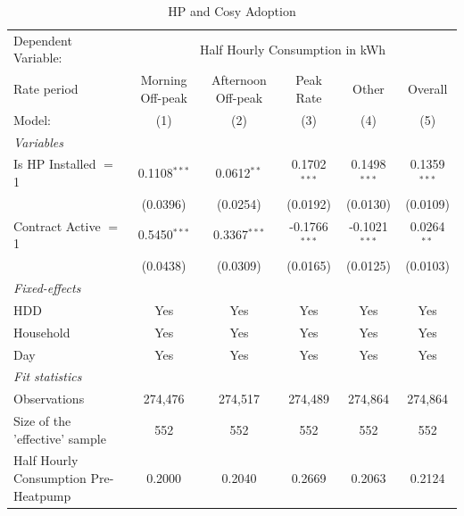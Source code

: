
\begin{table}[htbp]
   \caption{\label{tab:did-hp-install} HP and Cosy Adoption}
   \centering
   \begin{tabular}{lccccc}
      \tabularnewline \midrule \midrule
      Dependent Variable: & \multicolumn{5}{c}{Half Hourly Consumption in kWh}\\
      Rate period                                 & Morning Off-peak & Afternoon Off-peak & Peak Rate       & Other           & Overall \\   
      Model:                                      & (1)              & (2)                & (3)             & (4)             & (5)\\  
      \midrule
      \emph{Variables}\\
      Is HP Installed $=$ 1                       & 0.1108$^{***}$   & 0.0612$^{**}$      & 0.1702$^{***}$  & 0.1498$^{***}$  & 0.1359$^{***}$\\   
                                                  & (0.0396)         & (0.0254)           & (0.0192)        & (0.0130)        & (0.0109)\\   
      Contract Active $=$ 1                       & 0.5450$^{***}$   & 0.3367$^{***}$     & -0.1766$^{***}$ & -0.1021$^{***}$ & 0.0264$^{**}$\\   
                                                  & (0.0438)         & (0.0309)           & (0.0165)        & (0.0125)        & (0.0103)\\   
      \midrule
      \emph{Fixed-effects}\\
      HDD                                         & Yes              & Yes                & Yes             & Yes             & Yes\\  
      Household                                   & Yes              & Yes                & Yes             & Yes             & Yes\\  
      Day                                         & Yes              & Yes                & Yes             & Yes             & Yes\\  
      \midrule
      \emph{Fit statistics}\\
      Observations                                & 274,476          & 274,517            & 274,489         & 274,864         & 274,864\\  
      Size of the 'effective' sample              & 552              & 552                & 552             & 552             & 552\\  
      Half Hourly Consumption Pre-Heatpump        & 0.2000           & 0.2040             & 0.2669          & 0.2063          & 0.2124\\  

\end{tabular}
\end{table}
